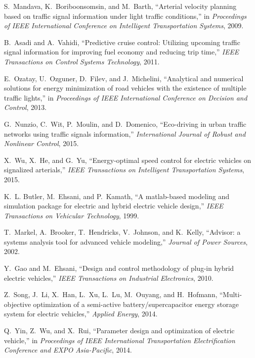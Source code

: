 S.~Mandava, K.~Boriboonsomsin, and M.~Barth, ``Arterial velocity planning based
  on traffic signal information under light traffic conditions,'' in {\em
  Proceedings of IEEE International Conference on Intelligent Transportation
  Systems}, 2009.

B.~Asadi and A.~Vahidi, ``Predictive cruise control: Utilizing upcoming traffic
  signal information for improving fuel economy and reducing trip time,'' {\em
  IEEE Transactions on Control Systems Technology}, 2011.

E.~Ozatay, U.~Ozguner, D.~Filev, and J.~Michelini, ``Analytical and numerical
  solutions for energy minimization of road vehicles with the existence of
  multiple traffic lights,'' in {\em Proceedings of IEEE International
  Conference on Decision and Control}, 2013.

G.~Nunzio, C.~Wit, P.~Moulin, and D.~Domenico, ``Eco-driving in urban traffic
  networks using traffic signals information,'' {\em International Journal of
  Robust and Nonlinear Control}, 2015.

X.~Wu, X.~He, and G.~Yu, ``Energy-optimal speed control for electric vehicles
  on signalized arterials,'' {\em IEEE Transactions on Intelligent
  Transportation Systems}, 2015.

K.~L. Butler, M.~Ehsani, and P.~Kamath, ``A matlab-based modeling and
  simulation package for electric and hybrid electric vehicle design,'' {\em
  IEEE Transactions on Vehicular Technology}, 1999.

T.~Markel, A.~Brooker, T.~Hendricks, V.~Johnson, and K.~Kelly, ``Advisor: a
  systems analysis tool for advanced vehicle modeling,'' {\em Journal of Power
  Sources}, 2002.

Y.~Gao and M.~Ehsani, ``Design and control methodology of plug-in hybrid
  electric vehicles,'' {\em IEEE Transactions on Industrial Electronics}, 2010.

Z.~Song, J.~Li, X.~Han, L.~Xu, L.~Lu, M.~Ouyang, and H.~Hofmann,
  ``Multi-objective optimization of a semi-active battery/supercapacitor energy
  storage system for electric vehicles,'' {\em Applied Energy}, 2014.

Q.~Yin, Z.~Wu, and X.~Rui, ``Parameter design and optimization of electric
  vehicle,'' in {\em Proceedings of IEEE International Transportation
  Electrification Conference and EXPO Asia-Pacific}, 2014.

